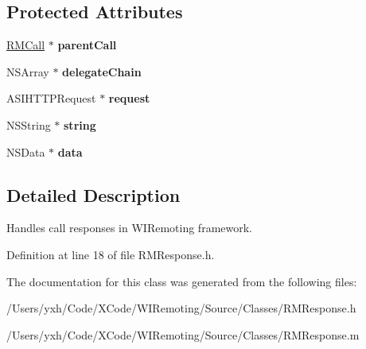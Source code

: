 \subsection*{Protected Attributes}
\begin{DoxyCompactItemize}
\item 
\hypertarget{interface_r_m_response_aead684dffc01908a30b52a9fec734939}{
\hyperlink{interface_r_m_call}{RMCall} $\ast$ {\bfseries parentCall}}
\label{interface_r_m_response_aead684dffc01908a30b52a9fec734939}

\item 
\hypertarget{interface_r_m_response_a8e6cf0138d78a853f3d3d067a55e361a}{
NSArray $\ast$ {\bfseries delegateChain}}
\label{interface_r_m_response_a8e6cf0138d78a853f3d3d067a55e361a}

\item 
\hypertarget{interface_r_m_response_a8100e3ff4d7ad1ec1707c763a8690ff4}{
ASIHTTPRequest $\ast$ {\bfseries request}}
\label{interface_r_m_response_a8100e3ff4d7ad1ec1707c763a8690ff4}

\item 
\hypertarget{interface_r_m_response_a8a916fbec7712a005e611b7f5e4f4bdf}{
NSString $\ast$ {\bfseries string}}
\label{interface_r_m_response_a8a916fbec7712a005e611b7f5e4f4bdf}

\item 
\hypertarget{interface_r_m_response_a420513833840b50a963a6a1c2f02b975}{
NSData $\ast$ {\bfseries data}}
\label{interface_r_m_response_a420513833840b50a963a6a1c2f02b975}

\end{DoxyCompactItemize}


\subsection{Detailed Description}
Handles call responses in WIRemoting framework. 

Definition at line 18 of file RMResponse.h.

The documentation for this class was generated from the following files:\begin{DoxyCompactItemize}
\item 
/Users/yxh/Code/XCode/WIRemoting/Source/Classes/RMResponse.h\item 
/Users/yxh/Code/XCode/WIRemoting/Source/Classes/RMResponse.m\end{DoxyCompactItemize}
